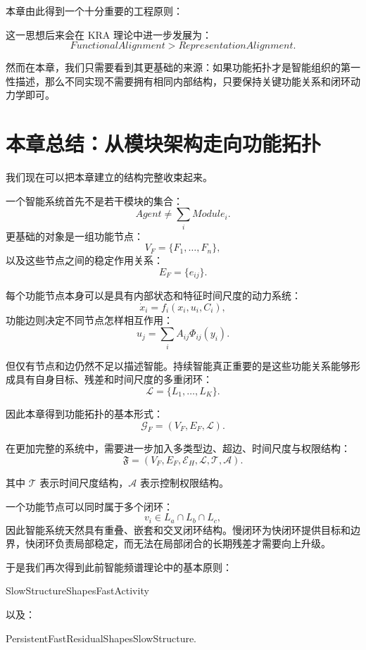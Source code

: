 本章由此得到一个十分重要的工程原则：
\begin{statementbox}
\centering
{}
\end{statementbox}

这一思想后来会在 KRA 理论中进一步发展为：
\[
FunctionalAlignment
>
RepresentationAlignment.
\]

然而在本章，我们只需要看到其更基础的来源：如果功能拓扑才是智能组织的第一性描述，那么不同实现不需要拥有相同内部结构，只要保持关键功能关系和闭环动力学即可。


\section{本章总结：从模块架构走向功能拓扑}

我们现在可以把本章建立的结构完整收束起来。

一个智能系统首先不是若干模块的集合：
\[
Agent
\neq
\sum_i Module_i.
\]
更基础的对象是一组功能节点：
\[
V_F
=
\{F_1,\ldots,F_n\},
\]
以及这些节点之间的稳定作用关系：
\[
E_F
=
\{e_{ij}\}.
\]

每个功能节点本身可以是具有内部状态和特征时间尺度的动力系统：
\[
\dot{x}_i
=
f_i(x_i,u_i,C_i),
\]
功能边则决定不同节点怎样相互作用：
\[
u_j
=
\sum_i
A_{ij}\Phi_{ij}(y_i).
\]

但仅有节点和边仍然不足以描述智能。持续智能真正重要的是这些功能关系能够形成具有自身目标、残差和时间尺度的多重闭环：
\[
\mathcal L
=
\{L_1,\ldots,L_K\}.
\]

因此本章得到功能拓扑的基本形式：
\[
\boxed{
\mathcal G_F
=
(V_F,E_F,\mathcal L).
}
\]

在更加完整的系统中，需要进一步加入多类型边、超边、时间尺度与权限结构：
\[
\boxed{
\mathfrak F
=
\left(
V_F,
E_F,
\mathcal E_H,
\mathcal L,
\mathcal T,
\mathcal A
\right).
}
\]

其中 $\mathcal T$ 表示时间尺度结构，$\mathcal A$ 表示控制权限结构。

一个功能节点可以同时属于多个闭环：
\[
v_i\in
L_a\cap L_b\cap L_c,
\]
因此智能系统天然具有重叠、嵌套和交叉闭环结构。慢闭环为快闭环提供目标和边界，快闭环负责局部稳定，而无法在局部闭合的长期残差才需要向上升级。

于是我们再次得到此前智能频谱理论中的基本原则：
\begin{statementbox}
SlowStructureShapesFastActivity
\end{statementbox}
以及：
\begin{statementbox}
PersistentFastResidualShapesSlowStructure.
\end{statementbox}


